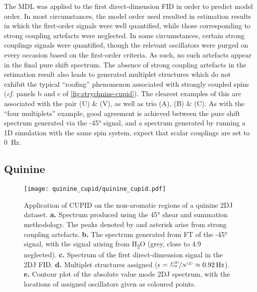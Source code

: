 The \ac{MDL} was applied to the first direct-dimension \ac{FID} in order to
predict model order. In most circumstances, the model order used resulted
in estimation results in which the first-order signals were well
quantified, while those corresponding to strong coupling artefacts were neglected.
In some circumstances, certain strong couplings signals were quantified, though
the relevant oscillators were purged on every occasion based on the first-order
criteria. As such, no such artefacts appear in the final pure shift spectrum.
The absence of strong coupling artefacts in the estimation result also leads to
generated multiplet structures which do not exhibit the typical ``roofing''
phenomenon associated with strongly coupled spins (\textit{cf.} panels b and c of
\cref{fig:strychnine-cupid}). The clearest examples of this are
associated with the pair (U) \& (V), as well as trio (A), (B) \& (C). As with the
``four multiplets'' example, good agreement is achieved between the pure shift
spectrum generated via the \ang{-45} signal, and a spectrum generated by
running a \ac{1D} simulation with the same spin system, expect that scalar couplings
are set to \qty{0}{\hertz}.

\subsection{Quinine}
\begin{figure}
    \centering
    \texttt{[image: quinine\_cupid/quinine\_cupid.pdf]}
    \caption[
        Application of \acs{CUPID} on the non-aromatic regions of a quinine
        \acs{2DJ} dataset.
    ]{
        Application of \ac{CUPID} on the non-aromatic regions of a quinine
        \ac{2DJ} dataset.
        \textbf{a.} Spectrum produced using the \ang{45} shear and summation
        methodology. The peaks denoted by and asterisk arise from strong
        coupling artefacts.
        \textbf{b.} The spectrum generated from \ac{FT} of the \ang{-45}
        signal, with the signal arising from H\textsubscript{2}O (grey, close
        to \qty{4.9}{\partspermillion} neglected).
        \textbf{c.} Spectrum of the first direct-dimension signal in the
        \ac{2DJ} \ac{FID}.
        \textbf{d.} Multiplet structures assigned ($\epsilon =
        \nicefrac{\fswtwo}{\Ntwo} \approx \qty{0.92}{\hertz}$).
        \textbf{e.} Contour plot of the absolute value mode \ac{2DJ} spectrum,
        with the locations of assigned oscillators given as coloured points.
    }
    \label{fig:quinine-cupid}
\end{figure}

